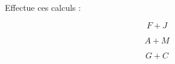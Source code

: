 Effectue ces calculs :
\begin{multicols}{3}
\[F+J\]
\begin{Myenumerate}
\item\dotfill
\item\dotfill
\item\dotfill
\item\dotfill
\item\dotfill
\item\dotfill
\item\dotfill
\item\dotfill
\item\dotfill
\end{Myenumerate}
\par
\[A+M\]
\begin{Myenumerate}
\item\dotfill
\item\dotfill
\item\dotfill
\item\dotfill
\item\dotfill
\item\dotfill
\item\dotfill
\item\dotfill
\item\dotfill
\end{Myenumerate}
\par
\[G+C\]
\begin{Myenumerate}
\item\dotfill
\item\dotfill
\item\dotfill
\item\dotfill
\item\dotfill
\item\dotfill
\item\dotfill
\item\dotfill
\item\dotfill
\end{Myenumerate}
\end{multicols}
